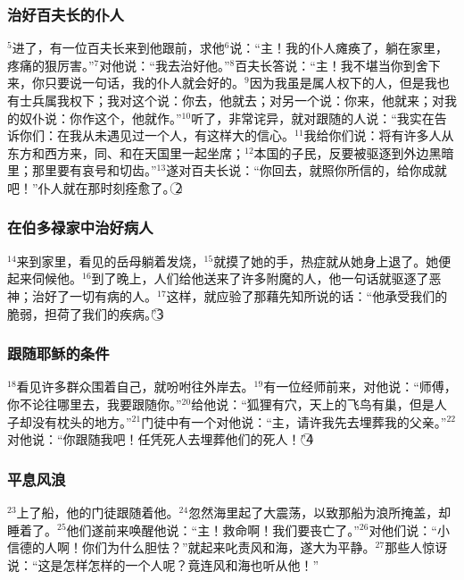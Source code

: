\subsubsection{治好百夫长的仆人}$^{5}$\UL[耶稣]进了\UL[葛法翁]，有一位百夫长来到他跟前，求他$^{6}$说：“主！我的仆人瘫痪了，躺在家里，疼痛的狠厉害。”$^{7}$\UL[耶稣]对他说：“我去治好他。”$^{8}$百夫长答说：“主！我不堪当你到舍下来，你只要说一句话，我的仆人就会好的。$^{9}$因为我虽是属人权下的人，但是我也有士兵属我权下；我对这个说：你去，他就去；对另一个说：你来，他就来；对我的奴仆说：你作这个，他就作。”$^{10}$\UL[耶稣]听了，非常诧异，就对跟随的人说：“我实在告诉你们：在\UL[以色列]我从未遇见过一个人，有这样大的信心。$^{11}$我给你们说：将有许多人从东方和西方来，同\UL[亚巴郎]、\UL[依撒格]和\UL[雅各伯]在天国里一起坐席；$^{12}$本国的子民，反要被驱逐到外边黑暗里；那里要有哀号和切齿。”$^{13}$\UL[耶稣]遂对百夫长说：“你回去，就照你所信的，给你成就吧！”仆人就在那时刻痊愈了。\textcircled{2}


\subsubsection{在伯多禄家中治好病人}
$^{14}$\UL[耶稣]来到\UL[伯多禄]家里，看见\UL[伯多禄]的岳母躺着发烧，$^{15}$就摸了她的手，热症就从她身上退了。她便起来伺候他。$^{16}$到了晚上，人们给他送来了许多附魔的人，他一句话就驱逐了恶神；治好了一切有病的人。$^{17}$这样，就应验了那藉\UL[依撒意亚]先知所说的话：“他承受我们的脆弱，担荷了我们的疾病。”\textcircled{3}


\subsubsection{跟随耶稣的条件}
$^{18}$\UL[耶稣]看见许多群众围着自己，就吩咐往外岸去。$^{19}$有一位经师前来，对他说：“师傅，你不论往哪里去，我要跟随你。”$^{20}$\UL[耶稣]给他说：“狐狸有穴，天上的飞鸟有巢，但是人子却没有枕头的地方。”$^{21}$门徒中有一个对他说：“主，请许我先去埋葬我的父亲。”$^{22}$\UL[耶稣]对他说：“你跟随我吧！任凭死人去埋葬他们的死人！”\textcircled{4}


\subsubsection{平息风浪}
$^{23}$\UL[耶稣]上了船，他的门徒跟随着他。$^{24}$忽然海里起了大震荡，以致那船为浪所掩盖，\UL[耶稣]却睡着了。$^{25}$他们遂前来唤醒他说：“主！救命啊！我们要丧亡了。”$^{26}$\UL[耶稣]对他们说：“小信德的人啊！你们为什么胆怯？”就起来叱责风和海，遂大为平静。$^{27}$那些人惊讶说：“这是怎样怎样的一个人呢？竟连风和海也听从他！”


